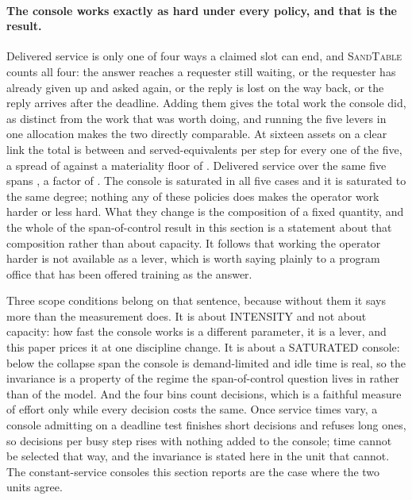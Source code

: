 \documentclass[11pt]{article}
\newcommand{\sandtable}{\textsc{SandTable}}
\begin{document}
\begin{table}[H]
\centering
\caption{Service order at fixed information. Sixteen assets, one console, clear link, mixed-deadline
fleet; every row sees the same requests with the same fields and differs only in the order it works
them. Levels are blockwise means over the full tier (32 blocks $\times$ 64 replications). ``Patient:
impatient'' is the ratio of answers per step delivered to the long-deadline half of the fleet against
the short-deadline half, so one is proportionate service. The last column is the gated verdict
against first come, first served on that ratio.}
\label{tab:fair}

\end{table}

\paragraph{The console works exactly as hard under every policy, and that is the result.} Delivered
service is only one of four ways a claimed slot can end, and \sandtable{} counts all four: the answer
reaches a requester still waiting, or the requester has already given up and asked again, or the
reply is lost on the way back, or the reply arrives after the deadline. Adding them gives the total
work the console did, as distinct from the work that was worth doing, and running the five levers in
one allocation makes the two directly comparable. At sixteen assets on a clear link the total is
between \KpClearEffortMin{} and \KpClearEffortMax{} served-equivalents per step for every one of the
five, a spread of \KpClearEffortSpread{} against a materiality floor of \LvMPE{}. Delivered service
over the same five spans \KpClearSrvSpread{}, a factor of \KpClearRatio{}. The console is saturated
in all five cases and it is saturated to the same degree; nothing any of these policies does makes
the operator work harder or less hard. What they change is the composition of a fixed quantity, and
the whole of the span-of-control result in this section is a statement about that composition rather
than about capacity. It follows that working the operator harder is not available as a lever, which
is worth saying plainly to a program office that has been offered training as the answer.

Three scope conditions belong on that sentence, because without them it says more than the
measurement does. It is about INTENSITY and not about capacity: how fast the console works is a
different parameter, it is a lever, and this paper prices it at one discipline change. It is about a
SATURATED console: below the collapse span the console is demand-limited and idle time is real, so
the invariance is a property of the regime the span-of-control question lives in rather than of the
model. And the four bins count decisions, which is a faithful measure of effort only while every
decision costs the same. Once service times vary, a console admitting on a deadline test finishes
short decisions and refuses long ones, so decisions per busy step rises with nothing added to the
console; time cannot be selected that way, and the invariance is stated here in the unit that
cannot. The constant-service consoles this section reports are the case where the two units agree.
\end{document}
